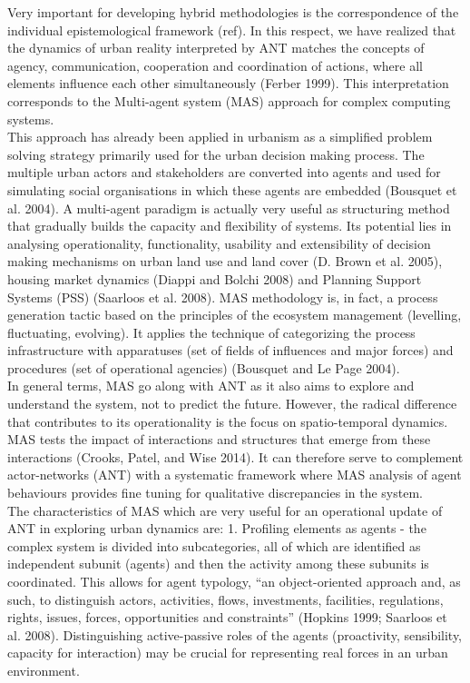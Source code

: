\documentclass[11pt]{report}
\begin{document}
Very important for developing hybrid methodologies is the correspondence of the individual epistemological framework (ref). In this respect, we have realized that the dynamics of urban reality interpreted by ANT matches the concepts of agency, communication, cooperation and coordination of actions, where all elements influence each other simultaneously (Ferber 1999). This interpretation corresponds to the Multi-agent system (MAS) approach for complex computing systems.
\\
This approach has already been applied in urbanism as a simplified problem solving strategy primarily used for the urban decision making process. The multiple urban actors and stakeholders are converted into agents and used for simulating social organisations in which these agents are embedded (Bousquet et al. 2004). A multi-agent paradigm is actually very useful as structuring method that gradually builds the capacity and flexibility of systems. Its potential lies in analysing  operationality, functionality, usability and extensibility of decision making mechanisms on urban land use and land cover (D. Brown et al. 2005), housing market dynamics (Diappi and Bolchi 2008) and Planning Support Systems (PSS) (Saarloos et al. 2008). MAS methodology is, in fact, a process generation tactic based on the principles of the ecosystem management (levelling, fluctuating, evolving). It applies the technique of categorizing the process infrastructure with apparatuses (set of fields of influences and major forces) and procedures (set of operational agencies) (Bousquet and Le Page 2004).
\\
In general terms, MAS go along with ANT as it also aims to explore and understand the system, not to predict the future. However, the radical difference that contributes to its operationality is the focus on spatio-temporal dynamics. MAS tests the impact of interactions and structures that emerge from these interactions (Crooks, Patel, and Wise 2014). It can therefore serve to complement actor-networks (ANT) with a systematic framework where MAS analysis of agent behaviours provides fine tuning for qualitative discrepancies in the system. 
\\
The characteristics of MAS which are very useful for an operational update of ANT in exploring urban dynamics are:
1.	Profiling elements as agents - the complex system is divided into subcategories, all of which are identified as independent subunit (agents) and then the activity among these subunits is coordinated. This allows for agent typology, “an object-oriented approach and, as such, to distinguish actors, activities, ﬂows, investments, facilities, regulations, rights, issues, forces, opportunities and constraints” (Hopkins 1999; Saarloos et al. 2008). Distinguishing active-passive roles of the agents (proactivity, sensibility, capacity for interaction) may be crucial for representing real forces in an urban environment. 
\end{document}
